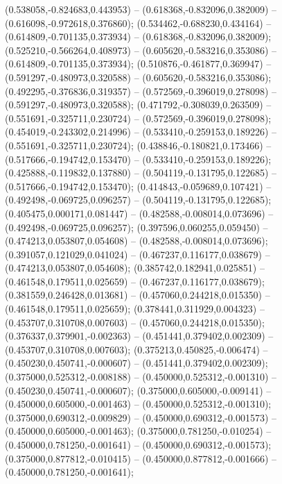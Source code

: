  (0.538058,-0.824683,0.443953) -- (0.618368,-0.832096,0.382009) -- (0.616098,-0.972618,0.376860);
 (0.534462,-0.688230,0.434164) -- (0.614809,-0.701135,0.373934) -- (0.618368,-0.832096,0.382009);
 (0.525210,-0.566264,0.408973) -- (0.605620,-0.583216,0.353086) -- (0.614809,-0.701135,0.373934);
 (0.510876,-0.461877,0.369947) -- (0.591297,-0.480973,0.320588) -- (0.605620,-0.583216,0.353086);
 (0.492295,-0.376836,0.319357) -- (0.572569,-0.396019,0.278098) -- (0.591297,-0.480973,0.320588);
 (0.471792,-0.308039,0.263509) -- (0.551691,-0.325711,0.230724) -- (0.572569,-0.396019,0.278098);
 (0.454019,-0.243302,0.214996) -- (0.533410,-0.259153,0.189226) -- (0.551691,-0.325711,0.230724);
 (0.438846,-0.180821,0.173466) -- (0.517666,-0.194742,0.153470) -- (0.533410,-0.259153,0.189226);
 (0.425888,-0.119832,0.137880) -- (0.504119,-0.131795,0.122685) -- (0.517666,-0.194742,0.153470);
 (0.414843,-0.059689,0.107421) -- (0.492498,-0.069725,0.096257) -- (0.504119,-0.131795,0.122685);
 (0.405475,0.000171,0.081447) -- (0.482588,-0.008014,0.073696) -- (0.492498,-0.069725,0.096257);
 (0.397596,0.060255,0.059450) -- (0.474213,0.053807,0.054608) -- (0.482588,-0.008014,0.073696);
 (0.391057,0.121029,0.041024) -- (0.467237,0.116177,0.038679) -- (0.474213,0.053807,0.054608);
 (0.385742,0.182941,0.025851) -- (0.461548,0.179511,0.025659) -- (0.467237,0.116177,0.038679);
 (0.381559,0.246428,0.013681) -- (0.457060,0.244218,0.015350) -- (0.461548,0.179511,0.025659);
 (0.378441,0.311929,0.004323) -- (0.453707,0.310708,0.007603) -- (0.457060,0.244218,0.015350);
 (0.376337,0.379901,-0.002363) -- (0.451441,0.379402,0.002309) -- (0.453707,0.310708,0.007603);
 (0.375213,0.450825,-0.006474) -- (0.450230,0.450741,-0.000607) -- (0.451441,0.379402,0.002309);
 (0.375000,0.525312,-0.008188) -- (0.450000,0.525312,-0.001310) -- (0.450230,0.450741,-0.000607);
 (0.375000,0.605000,-0.009141) -- (0.450000,0.605000,-0.001463) -- (0.450000,0.525312,-0.001310);
 (0.375000,0.690312,-0.009829) -- (0.450000,0.690312,-0.001573) -- (0.450000,0.605000,-0.001463);
 (0.375000,0.781250,-0.010254) -- (0.450000,0.781250,-0.001641) -- (0.450000,0.690312,-0.001573);
 (0.375000,0.877812,-0.010415) -- (0.450000,0.877812,-0.001666) -- (0.450000,0.781250,-0.001641);
